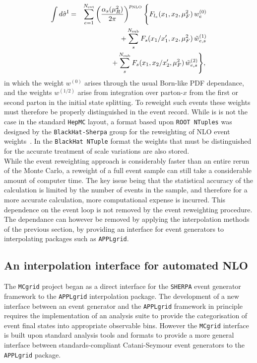 \def\varref#1{{\tt #1}}
\begin{eqnarray}
 \int d\hat{\sigma}^\mathrm{I}  &=&  \sum_{e=1}^{N_{\mathrm{evt}}}   \left(  {{\alpha_s(\mu_R^2)}\over {2\pi}} \right)^{p_{\text{NLO}}} \Bigg\{  F_{l_e}(x_1,x_2,\mu^2_F)\,  w^{(0)}_e 
\nonumber\\
&&+\sum_{s}^{N_{\text{sub}}} F_s(x_1/x'_1, x_2, \mu^2_F)\, \tilde{w}^{(1)}_{e,s} \label{eq:NTupleBreakdown} \\
&&+\sum_{s}^{N_{\text{sub}}} F_s(x_1, x_2/x'_2, \mu^2_F)\, \tilde{w}^{(2)}_{e,s}
 \Bigg\},
  \, \nonumber 
\end{eqnarray}
in which the weight $w^{(0)}$ arises through the usual Born-like PDF dependance, and the weights $w^{(1/2)}$ arise from integration over parton-$x$ from the first or second parton in the initial state splitting. To reweight such events these weights must therefore be properly distinguished
in the event record. While is is not the case in the standard {\tt HepMC} layout, a format based upon {\tt ROOT NTuples} was designed by the {\tt BlackHat-Sherpa} group for the reweighting of NLO event weights~\cite{Bern:2013zja}. In the {\tt BlackHat NTuple} format the weights that must be distinguished for the accurate treatment of scale variations are also stored.  \\
While the event reweighting approach is considerably faster than an entire rerun of the Monte Carlo, a reweight of a full event sample can still take a considerable amount of computer time. The key issue being that the statistical accuracy of the calculation is limited by the number of events in the sample, and therefore for a more accurate calculation, more computational expense is incurred. This dependence on the event loop is not removed by the event reweighting procedure. The dependance can however be removed by applying the interpolation methods of the previous section, by providing an interface for event generators to interpolating packages such as { \tt APPLgrid}.
\subsection{An interpolation interface for automated NLO} 
\label{sec:interp}
The {\tt MCgrid} project began as a direct interface for the {\tt SHERPA} event generator framework to the {\tt APPLgrid} interpolation package. The development of a new interface between an event generator and the {\tt APPLgrid} framework in principle requires the implementation of an analysis suite to provide the categorisation of event final states into appropriate observable bins. However the {\tt MCgrid} interface is built upon standard analysis tools and formats to provide a more general interface between standards-compliant Catani-Seymour event generators to the {\tt APPLgrid} package.

